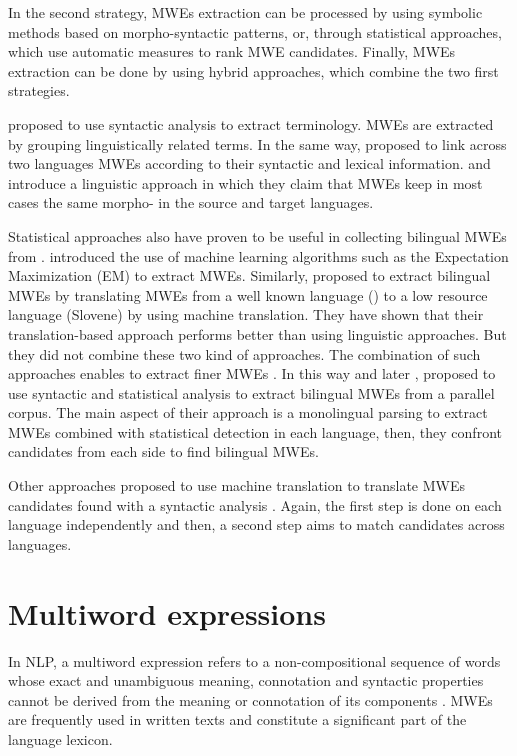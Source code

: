 \documentclass[output=paper,modfonts,nonflat]{langsci/langscibook}
\begin{document}
In the second strategy, MWEs extraction can be processed by using symbolic methods based on morpho-syntactic patterns, or, through statistical approaches, which use automatic measures to rank MWE candidates. Finally, MWEs extraction can be done by using hybrid approaches, which combine the two first strategies.

\cite{dagan1994termight} proposed to use syntactic analysis to extract terminology. MWEs are extracted by grouping linguistically related terms. In the same way, \cite{okita2010multi} proposed to link across two languages MWEs according to their syntactic and lexical information. \cite{tufis2007parallel} and \cite{seretan2007collocation} introduce a linguistic approach in which they claim that MWEs keep in most cases the same morpho- in the source and target languages.

Statistical approaches also have proven to be useful in collecting bilingual MWEs from . \cite{kupiec1993algorithm} introduced the use of machine learning algorithms such as the Expectation Maximization (EM) to extract MWEs. Similarly, \cite{vintar2008harvesting} proposed to extract bilingual MWEs by translating MWEs from a well known language () to a low resource language (Slovene) by using machine translation. They have shown that their translation-based approach performs better than using linguistic approaches. But they did not combine these two kind of approaches. The combination of such approaches enables to extract finer MWEs \citep{daille2001extraction}. In this way \cite{wu2003bilingual} and later \cite{boulaknadel2008multiterm}, proposed to use syntactic and statistical analysis to extract bilingual MWEs from a parallel corpus. The main aspect of their approach is a monolingual parsing to extract MWEs combined with statistical detection in each language, then, they confront candidates from each side to find bilingual MWEs.

Other approaches proposed to use machine translation to translate MWEs candidates found with a syntactic analysis \citep{seretan2007collocation}. Again, the first step is done on each language independently and then, a second step aims to match candidates across languages.

\section{Multiword expressions}\label{sec:semmar:3}
In NLP, a multiword expression  refers to a non-composi\-tional sequence of words whose exact and unambiguous meaning, connotation and syntactic properties cannot be derived from the meaning or connotation of its components \citep{choueka1988looking,sag02}.
MWEs are frequently used in written texts and constitute a significant part of the language lexicon.
\end{document}
